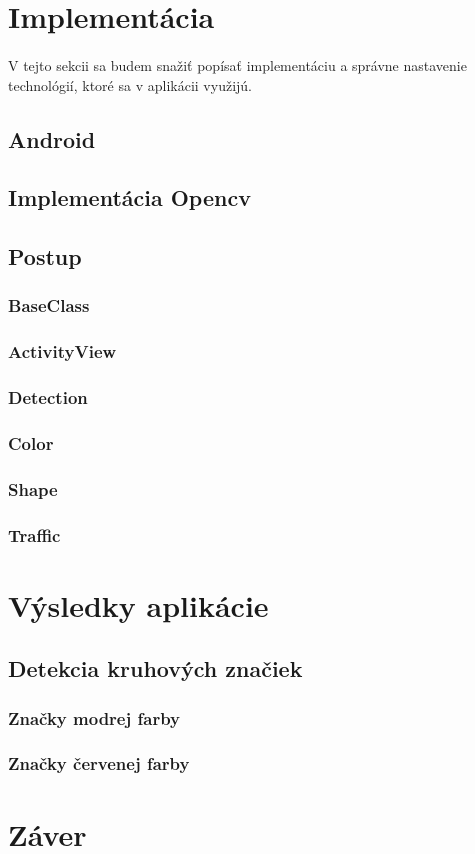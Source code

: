 \documentclass[12pt]{article}
\begin{document}
\section{Implementácia}
\paragraph{}
V tejto sekcii sa budem snažiť popísať implementáciu a správne nastavenie technológií, ktoré sa v aplikácii využijú.
\subsection{Android}
\subsection{Implementácia Opencv}
\subsection{Postup}
\subsubsection{BaseClass}
\subsubsection{ActivityView}
\subsubsection{Detection}
\subsubsection{Color}
\subsubsection{Shape}
\subsubsection{Traffic}

\section{Výsledky aplikácie}
\subsection{Detekcia kruhových značiek}
\subsubsection{Značky modrej farby}
\subsubsection{Značky červenej farby}

\section{Záver}



\end{document}
